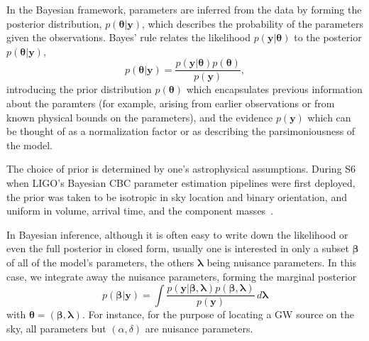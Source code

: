 \documentclass[amsmath,amssymb,aps,prx,reprint,nopreprintnumbers,nofootinbib]{revtex4-1}
\begin{document}
In the Bayesian framework, parameters are inferred from the data by forming the posterior distribution, $p(\bm\theta|\mathbf y)$, which describes the probability of the parameters given the observations. Bayes' rule relates the likelihood $p(\mathbf y|\bm\theta)$ to the posterior $p(\bm\theta|\mathbf y)$,
%
\begin{equation}\label{bayes}
p(\bm\theta|\mathbf y) = \frac{p(\mathbf y|\bm\theta) p(\bm\theta)}{p(\mathbf y)},
\end{equation}
%
introducing the prior distribution $p(\bm\theta)$ which encapsulates previous information about the paramters (for example, arising from earlier observations or from known physical bounds on the parameters), and the evidence $p(\mathbf y)$ which can be thought of as a normalization factor or as describing the parsimoniousness of the model.

The choice of prior is determined by one's astrophysical assumptions. During \ac{S6} when LIGO's Bayesian \ac{CBC} parameter estimation pipelines were first deployed, the prior was taken to be isotropic in sky location and binary orientation, and uniform in volume, arrival time, and the component masses~\cite{S6PE}.

In Bayesian inference, although it is often easy to write down the likelihood or even the full posterior in closed form, usually one is interested in only a subset $\bm\beta$ of all of the model's parameters, the others $\bm\lambda$ being nuisance parameters. In this case, we integrate away the nuisance parameters, forming the marginal posterior
%
\begin{equation}\label{eq:marginal-posterior}
    p(\bm\beta|\mathbf y) = \int \frac{p(\mathbf y|\bm\beta,\bm\lambda) p(\bm\beta,\bm\lambda)}{p(\mathbf y)} \,d\bm\lambda
\end{equation}
%
with $\bm\theta = (\bm\beta, \bm\lambda)$. For instance, for the purpose of locating a \ac{GW} source on the sky, all parameters but $(\alpha, \delta)$ are nuisance parameters.

\end{document}
